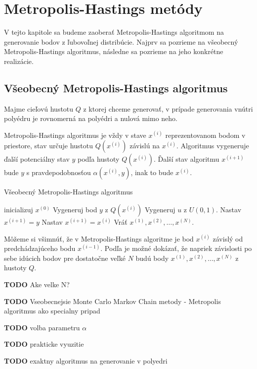 \chapter{Metropolis-Hastings metódy}

V tejto kapitole sa budeme zaoberať Metropolis-Hastings algoritmom na generovanie bodov z ľubovoľnej distribúcie. Najprv sa pozrieme na všeobecný Metropolis-Hastings algoritmus, následne sa pozrieme na jeho konkrétne realizácie.

\section{Všeobecný Metropolis-Hastings algoritmus}

Majme cieľovú hustotu $Q$ z ktorej chceme generovať, v prípade generovania vnútri polyédru je rovnomerná na polyédri a nulová mimo neho.

Metropolis-Hastings algoritmus je vždy v stave $x^{(i)}$ reprezentovanom bodom v priestore, stav určuje hustotu $Q(x^{(i)})$ závislú na $x^{(i)}$. Algoritmus vygeneruje ďalší potenciálny stav $y$ podľa hustoty $Q(x^{(i)})$. Ďalší stav algoritmu $x^{(i+1)}$ bude $y$ s pravdepodobnosťou $\alpha (x^{(i)},y)$, inak to bude $x^{(i)}$.

\begin{algorithm}[H]
	\caption{Všeobecný Metropolis-Hastings algoritmus \cite{metropolis-hastings_chib}}
	\label{metropolis-hastings}
	\begin{algorithmic}[1]
		\State inicializuj $x^{(0)}$
			\State Vygeneruj bod $y$ z $Q(x^{(i)})$
			\State Vygeneruj $u$ z $U(0,1)$.
				\State Nastav $x^{(i+1)}=y$
			\Else
				\State Nastav $x^{(i+1)}=x^{(i)}$
			\EndIf
		\EndFor
		\State Vráť ${x^{(1)},x^{(2)},\dots,x^{(N)}}$.
	\end{algorithmic}
\end{algorithm}

Môžeme si všimnúť, že v Metropolis-Hastings algoritme je bod $x^{(i)}$ závislý od predchádzajúceho bodu $x^{(i-1)}$. Podľa \cite{metropolis-hastings_chib} je možné dokázať, že napriek závislosti po sebe idúcich bodov pre dostatočne veľké $N$ budú body ${x^{(1)},x^{(2)},\dots,x^{(N)}}$ z hustoty $Q$.

\textbf{TODO} Ake velke N?

\textbf{TODO} Vseobecnejsie Monte Carlo Markov Chain metody - Metropolis algoritmus ako specialny pripad

\textbf{TODO} volba parametru $\alpha$

\textbf{TODO} prakticke vyuzitie

\textbf{TODO} exaktny algoritmus na generovanie v polyedri
